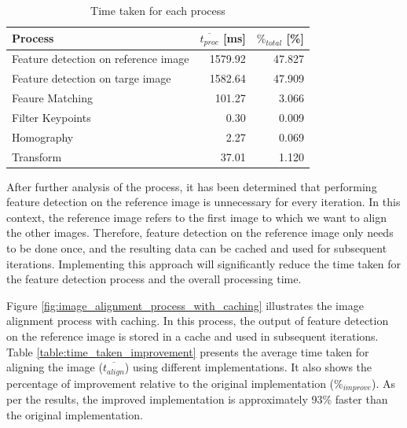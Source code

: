 \begin{table}[!ht]
    \centering
    \begin{tabular}{|l|r|r|}
        \hline
        \textbf{Process}                     & \textbf{$\overline{t_{proc}}$ [ms]} & \textbf{$\%_{total}$ [\%]} \\ \hline
        Feature detection on reference image & 1579.92                             & 47.827                     \\ \hline
        Feature detection on targe image     & 1582.64                             & 47.909                     \\ \hline
        Feaure Matching                      & 101.27                              & 3.066                      \\ \hline
        Filter Keypoints                     & 0.30                                & 0.009                      \\ \hline
        Homography                           & 2.27                                & 0.069                      \\ \hline
        Transform                            & 37.01                               & 1.120                      \\ \hline
    \end{tabular}
    \caption{Time taken for each process}
    \label{table:time_taken}
\end{table}


After further analysis of the process, it has been determined that performing feature detection on the reference image is unnecessary for every iteration. In this context, the reference image refers to the first image to which we want to align the other images. Therefore, feature detection on the reference image only needs to be done once, and the resulting data can be cached and used for subsequent iterations. Implementing this approach will significantly reduce the time taken for the feature detection process and the overall processing time.

Figure \ref{fig:image_alignment_process_with_caching} illustrates the image alignment process with caching. In this process, the output of feature detection on the reference image is stored in a cache and used in subsequent iterations. Table \ref{table:time_taken_improvement} presents the average time taken for aligning the image ($\overline{t_{align}}$) using different implementations. It also shows the percentage of improvement relative to the original implementation ($\%_{improve}$). As per the results, the improved implementation is approximately 93\% faster than the original implementation.

